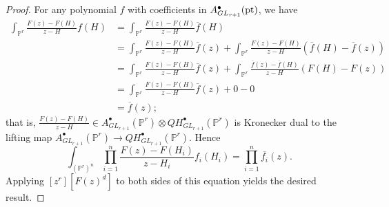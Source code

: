 \documentclass[12pt]{amsart}
\newcommand{\mb}{\mathbb}
\newcommand{\pt}{{\rm pt}}
\theoremstyle{plain}
\theoremstyle{definition}
\theoremstyle{remark}
\begin{document}
\begin{proof}
For any polynomial $f$ with coefficients in $A^\bullet_{GL_{r+1}}(\pt)$, we have
\begin{align*}
\int_{\mb{P}^r} \frac{F(z)-F(H)}{z-H}f(H)&=\int_{\mb{P}^r} \frac{F(z)-F(H)}{z-H}\overline{f}(H) \\
&= \int_{\mb{P}^r} \frac{F(z)-F(H)}{z-H} \overline{f}(z) +  \int_{\mb{P}^r} \frac{F(z)-F(H)}{z-H}(\overline{f}(H)-\overline{f}(z)) \\
&=\int_{\mb{P}^r} \frac{F(z)-F(H)}{z-H} \overline{f}(z) + \int_{\mb{P}^r} \frac{\overline{f}(z)-\overline{f}(H)}{z-H}(F(H)-F(z)) \\
&= \int_{\mb{P}^r}\frac{F(z)-F(H)}{z-H}\overline{f}(z) + 0 - 0 \\
&= \overline{f}(z);
\end{align*} that is, $\frac{F(z)-F(H)}{z-H}\in A^\bullet_{GL_{r+1}}(\mb{P}^r)\otimes QH^\bullet_{GL_{r+1}}(\mb{P}^r)$ is Kronecker dual to the lifting map $A^\bullet_{GL_{r+1}}(\mb{P}^r)\to QH^\bullet_{GL_{r+1}}(\mb{P}^r)$. Hence $$\int_{(\mb{P}^r)^n}\prod_{i=1}^n \frac{F(z)-F(H_i)}{z-H_i}f_i(H_i)=\prod_{i=1}^n \overline{f_i}(z).$$
Applying $[z^r][F(z)^{d}]$ to both sides of this equation yields the desired result.

\end{proof}
\end{document}
